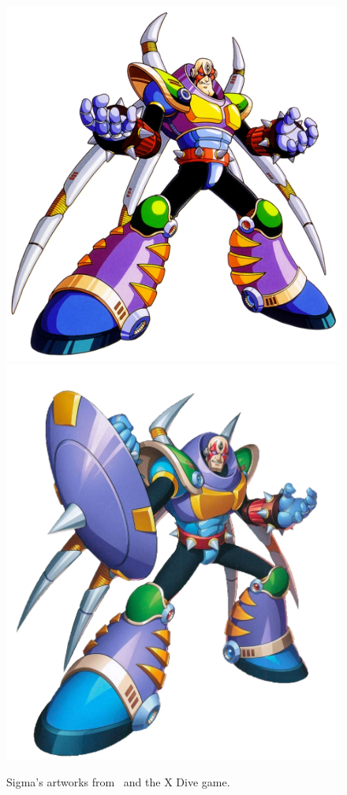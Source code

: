 \begin{figure}[htp]
	\centering
	\includegraphics[height=\portraitsize]{figures/X3/Doppler_stages/Sigma.png}
	\includegraphics[height=\portraitsize]{figures/X3/Doppler_stages/X_DiVe_Sigma3.png}
	\caption{Sigma's artworks from~\cite{book:MMX_Complete_art} and the X Dive game.}
\end{figure}
